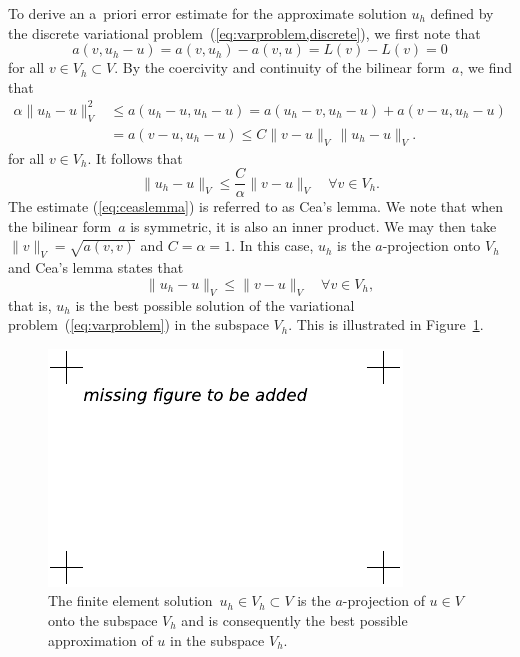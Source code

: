 To derive an a~priori error estimate for the approximate solution
$u_h$ defined by the discrete variational
problem~(\ref{eq:varproblem,discrete}), we first note that
\begin{displaymath}
  a(v, u_h - u) = a(v, u_h) - a(v, u) = L(v) - L(v) = 0
\end{displaymath}
for all $v \in V_h \subset V$. By the coercivity and continuity of the
bilinear form~$a$, we find that
\begin{displaymath}
  \begin{split}
    \alpha \|u_h - u\|_V^2
    &\leq a(u_h - u, u_h - u)
    = a(u_h - v, u_h - u) + a(v - u, u_h - u) \\
    &= a(v - u, u_h - u) \leq C \|v - u\|_V \, \|u_h - u\|_V.
  \end{split}
\end{displaymath}
for all $v \in V_h$. It follows that
\begin{equation} \label{eq:ceaslemma}
  \|u_h - u\|_V
  \leq \frac{C}{\alpha} \|v - u\|_V \quad \forall v \in V_h.
\end{equation}
The estimate (\ref{eq:ceaslemma}) is referred to as Cea's lemma. We
note that when the bilinear form~$a$ is symmetric, it is also an inner
product. We may then take $\|v\|_V = \sqrt{a(v, v)}$ and $C = \alpha =
1$. In this case, $u_h$ is the $a$-projection onto $V_h$ and Cea's
lemma states that
\begin{equation}
  \|u_h - u\|_V \leq \|v - u\|_V \quad \forall v \in V_h,
\end{equation}
that is, $u_h$ is the best possible solution of the variational
problem~(\ref{eq:varproblem}) in the subspace $V_h$. This is
illustrated in Figure~\ref{fig:ceaslemma}.

\begin{figure}
  \begin{center}
    \includegraphics[width=\largefig]{chapters/kirby-7/pdf/missing-figure.pdf}
    \caption{The finite element solution~$u_h \in V_h \subset V$ is
      the $a$-projection of $u \in V$ onto the subspace $V_h$ and is
      consequently the best possible approximation of $u$ in the
      subspace $V_h$.}
    \label{fig:ceaslemma}
  \end{center}
\end{figure}

